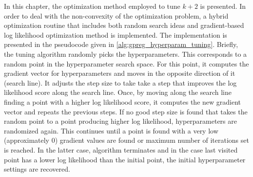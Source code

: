 In this chapter, the optimization method employed to tune $k+2$ is presented. In order to deal with the non-convexity of the optimization problem, a hybrid optimization routine that includes both random search ideas and gradient-based log likelihood optimization method is implemented. The implementation is presented in the pseudocode given in \ref{alg:gpreg_hyperparam_tuning}. Briefly, the tuning algorithm randomly picks the hyperparameters. This corresponds to a random point in the hyperparameter search space. For this point, it computes the gradient vector for hyperparameters and moves in the opposite direction of it (search line). It adjusts the step size to take take a step that improves the log likelihood score along the search line. Once, by moving along the search line finding a point with a higher log likelihood score, it computes the new gradient vector and repeats the previous steps. If no good step size is found that takes the random point to a point producing higher log likelihood, hyperparameters are randomized again. This continues until a point is found with a very low (approximately 0) gradient values are found or maximum number of iterations set is reached. In the latter case, algorithm terminates and in the case last visited point has a lower log likelihood than the initial point, the initial hyperparameter settings are recovered.

